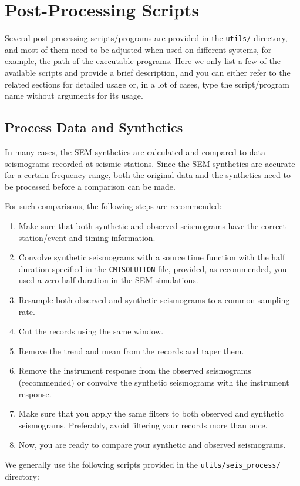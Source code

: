 \chapter{Post-Processing Scripts}

Several post-processing scripts/programs are provided in the \texttt{utils/}
directory, and most of them need to be adjusted when used on different
systems, for example, the path of the executable programs. Here we
only list a few of the available scripts and provide a brief description,
and you can either refer to the related sections for detailed usage
or, in a lot of cases, type the script/program name without arguments
for its usage.


\section{Process Data and Synthetics}\label{sec:Process-data-and-syn}

In many cases, the SEM synthetics are calculated and compared to data
seismograms recorded at seismic stations. Since the SEM synthetics
are accurate for a certain frequency range, both the original data
and the synthetics need to be processed before a comparison can be
made.\newline

For such comparisons, the following steps are recommended:
\begin{enumerate}
\item Make sure that both synthetic and observed seismograms have the correct
station/event and timing information.
\item Convolve synthetic seismograms with a source time function with the
half duration specified in the \texttt{CMTSOLUTION} file, provided,
as recommended, you used a zero half duration in the SEM simulations.
\item Resample both observed and synthetic seismograms to a common sampling
rate.
\item Cut the records using the same window.
\item Remove the trend and mean from the records and taper them.
\item Remove the instrument response from the observed seismograms (recommended)
or convolve the synthetic seismograms with the instrument response.
\item Make sure that you apply the same filters to both observed and synthetic
seismograms. Preferably, avoid filtering your records more than once.
\item Now, you are ready to compare your synthetic and observed seismograms.
\end{enumerate}
\noindent We generally use the following scripts provided in the \texttt{utils/seis\_process/}
directory:


